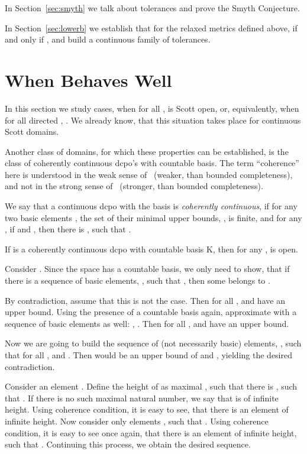 In Section~\ref{sec:smyth} we talk about tolerances and prove
the Smyth Conjecture.

In Section~\ref{sec:lowerb} we establish that for the relaxed
metrics defined above,  if and only if ,
and build a continuous family of tolerances.

\section{When  Behaves Well}\label{sec:good}

In this section we study cases, when for all ,  is Scott open,
or, equivalently, when for all directed ,
. We already know, that this
situation takes place for continuous Scott domains.

Another class of domains, for which these properties can be established,
is the class of coherently continuous dcpo's with countable basis.
The term ``coherence'' here is understood in the weak sense
of~\cite{Abramsky} (weaker, than bounded completeness), and not in the
strong sense of~\cite{Gunter} (stronger, than bounded completeness).

\Def We say that a continuous dcpo  with the basis  is {\em
coherently
continuous}, if for any two basic elements ,
the set of their minimal upper bounds, , is finite,
and for any , if  and ,
then there is , such that .

\begin{theorem} If  is a coherently continuous dcpo with countable basis
K,
then for any ,  is open.
\end{theorem}
\Proof
Consider . Since the space has a countable basis,
we only need to show, that if there is a sequence of basic
elements, ,
such that , then some  belongs to .

By contradiction, assume that this is not the case. Then
for all ,  and  have an upper bound. Using the
presence of a countable basis again, approximate  with
a sequence of basic elements as well: , . Then for all ,
 and  have an upper bound.

Now we are going to build the sequence of (not necessarily basic)
elements, ,
such that for all ,  and .
Then  would be an upper bound of  and , yielding
the desired contradiction.

Consider an element . Define the height
of  as maximal , such that there is ,
such that . If there is no such maximal natural number,
we say that  is of infinite height. Using coherence condition,
it is easy to see, that there is an element 
of infinite height. Now consider only elements ,
such that . Using coherence condition, it is easy to
see once again, that there is an element  of
infinite height, such that . Continuing this
process, we obtain the desired sequence.
\eproof

